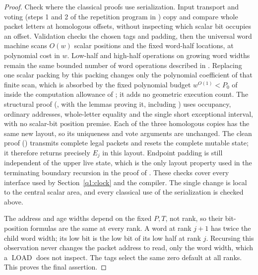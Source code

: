 \begin{proof}
Check where the classical proofs use serialization. Input transport and voting (steps 1 and 2 of the repetition program in \cite[Section~\ref*{cl:sec:packets}]{DMNoise1D2026}) copy and compare whole packet letters at homologous offsets, without inspecting which scalar bit occupies an offset. Validation checks the chosen tags and padding, then the universal word machine scans \(O(w)\) scalar positions and the fixed word-half locations, at polynomial cost in \(w\). Low-half and high-half operations on growing word widths remain the same bounded number of word operations described in \cite[Section~\ref*{cl:sec:packets}]{DMNoise1D2026}. Replacing one scalar packing by this packing changes only the polynomial coefficient of that finite scan, which is absorbed by the fixed polynomial budget \(w^{O(1)}<P_0\) of \cite[Section~\ref*{cl:sec:packets}]{DMNoise1D2026} inside the computation allowance of \cite[Section~\ref*{cl:sec:clock}]{DMNoise1D2026}; it adds no geometric execution count. The structural proof (\cite[Definition~\ref*{cl:def:observations} and Proposition~\ref*{cl:prop:organization}]{DMNoise1D2026}, with the lemmas proving it, including \cite[Lemmas~\ref*{cl:lem:endpoint} and~\ref*{cl:lem:two-period}]{DMNoise1D2026}) uses occupancy, ordinary addresses, whole-letter equality and the single short exceptional interval, with no scalar-bit position premise. Each of the three homologous copies has the same new layout, so its uniqueness and vote arguments are unchanged. The clean proof (\cite[Lemma~\ref*{cl:lem:clean}]{DMNoise1D2026}) transmits complete legal packets and resets the complete mutable state; it therefore returns precisely \(E_{j}\) in this layout. Endpoint padding is still independent of the upper live state, which is the only layout property used in the terminating boundary recursion in the proof of \cite[Lemma~\ref*{cl:lem:past}]{DMNoise1D2026}. These checks cover every interface used by Section~\ref{q1:clock} and the compiler. The single change is local to the central scalar area, and every classical use of the serialization is checked above.

The address and age widths depend on the fixed \(P,T\), not rank, so their bit-position formulas are the same at every rank. A word at rank \(j+1\) has twice the child word width; its low bit is the low bit of its low half at rank \(j\). Recursing this observation never changes the packet address to read, only the word width, which a \(\operatorname{LOAD}\) does not inspect. The tags select the same zero default at all ranks. This proves the final assertion. 
\end{proof}



